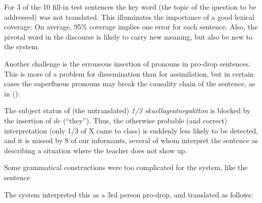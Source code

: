 \documentclass{book}
\begin{document}
For 3 of the 10 fill-in test sentences the key word (the topic of
the question to be addressed) was not translated. This illuminates
the importance of a good lexical coverage: On average, 95\% coverage implies
one error for each sentence. Also, the pivotal word in the discourse
is likely to carry new meaning, but also be new to
the system. 

Another challenge is the erroneous insertion of pronouns in pro-drop
sentences. This is more of a problem for dissemination than for
assimilation, but in certain cases the superfluous pronouns may
break the causality chain of the sentence, as in ():

{}


The subject status of (the untranslated) \textit{1/3
  skuvllageatnegahtton} is blocked by the insertion of $de$
(``they''). Thus, the otherwise probable (and correct) interpretation
(only 1/3 of X came to class) is suddenly less likely to be detected,
and it is missed by 8 of our informants, several of whom interpret
the sentence as describing a situation where the teacher does not show up.



Some grammatical constructions were too complicated for the system, 
like the sentence



The system interpreted this as a 3rd person pro-drop, and translated
as follows:
\end{document}
